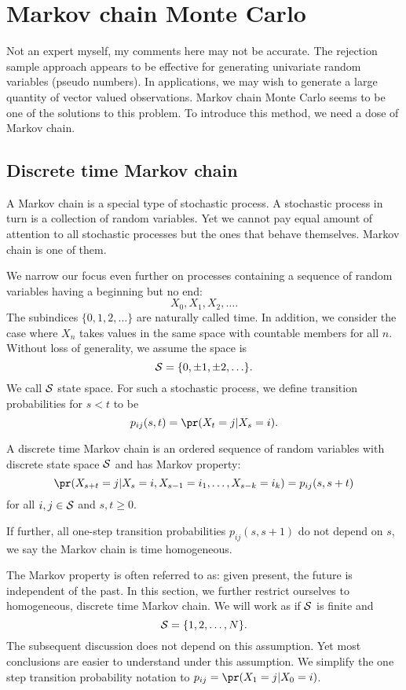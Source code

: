 \section{Markov chain Monte Carlo}
Not an expert myself, my comments here may not be accurate.
The rejection sample approach appears to be effective for
generating univariate random variables (pseudo numbers). 
In applications, we may wish to generate a large quantity of vector 
valued observations. Markov chain Monte Carlo seems to be
one of the solutions to this problem.
To introduce this method, we need a dose of Markov chain.

\subsection{Discrete time Markov chain}
A Markov chain is a special type of stochastic process. 
A stochastic process in turn is a collection of random variables.
Yet we cannot pay equal amount of attention to all stochastic
processes but the ones that behave themselves.  
Markov chain is one of them.

We narrow our focus even further on processes containing
a sequence of random variables having a beginning but no end:
\[
X_0, X_1, X_2, \ldots.
\]
The subindices $\{0, 1, 2, \ldots\}$ are naturally called time.
In addition, we consider the case where $X_n$ takes values
in the same space with countable members for all $n$.
Without loss of generality, we assume the space is
\[
{\cal S} = \{0, \pm 1, \pm 2, \ldots \}.
\]
We call ${\cal S}$ state space.
For such a stochastic process, we define transition probabilities
for $s < t$ to be
\[
p_{ij}(s, t) = \pr (X_t = j | X_s = i).
\]

\begin{defi}
A discrete time Markov chain is an ordered sequence of random variables
with discrete state space ${\cal S}$ and has Markov property:
\[
\pr (X_{s+t} = j | X_s = i, X_{s-1} = i_1, \ldots, X_{s - k} = i_k)
=
p_{ij}(s, s+t) 
\]
for all $i, j \in {\cal S}$ and $s, t \geq 0$.

If further, all one-step transition probabilities $p_{ij}(s, s+1)$
do not depend on $s$, we say the Markov chain is
time homogeneous.
\end{defi}

The Markov property is often referred to as: given present, the
future is independent of the past. In this section, we further
restrict ourselves to homogeneous, discrete time Markov chain. 
We will work as if ${\cal S}$ is finite and
\[
{\cal S} = \{1, 2, \ldots, N\}.
\]
The subsequent discussion does not depend on this assumption.
Yet most conclusions are easier to understand under this assumption.
We simplify the one step transition probability notation to
$p_{ij} = \pr(X_1 = j| X_0 = i)$.


